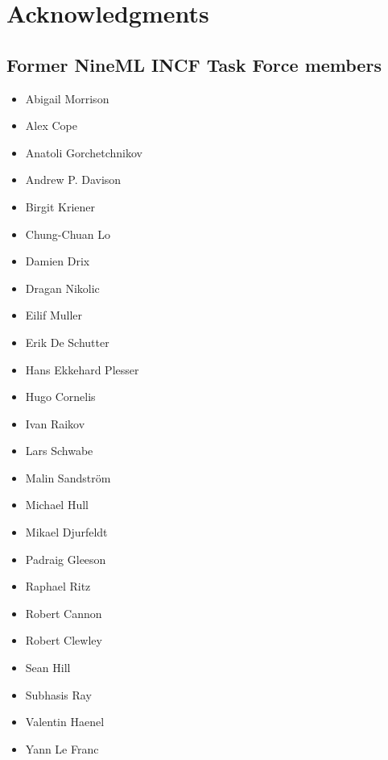 \documentclass[draftspec]{ninemlspec}
\begin{document}
\section{Acknowledgments}
\subsection{Former NineML INCF Task Force members}
\begin{itemize}
\item Abigail Morrison
\item Alex Cope
\item Anatoli Gorchetchnikov
\item Andrew P. Davison
\item Birgit Kriener
\item Chung-Chuan Lo
\item Damien Drix
\item Dragan Nikolic
\item Eilif Muller
\item Erik De Schutter
\item Hans Ekkehard Plesser
\item Hugo Cornelis
\item Ivan Raikov
\item Lars Schwabe
\item Malin Sandström
\item Michael Hull
\item Mikael Djurfeldt
\item Padraig Gleeson
\item Raphael Ritz
\item Robert Cannon
\item Robert Clewley
\item Sean Hill
\item Subhasis Ray
\item Valentin Haenel
\item Yann Le Franc
\end{itemize}

\clearpage


\end{document}
